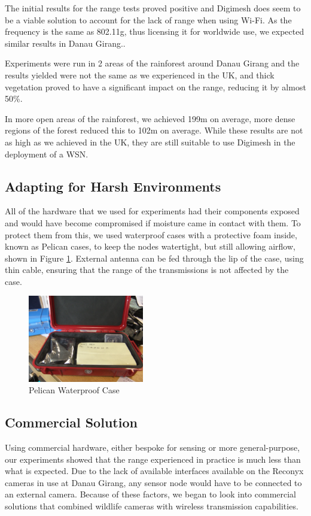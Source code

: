The initial results for the range tests proved positive and Digimesh does seem to be a viable solution to account for the lack of range when using Wi-Fi. As the frequency is the same as 802.11g, thus licensing it for worldwide use, we expected similar results in Danau Girang..
						
Experiments were run in 2 areas of the rainforest around Danau Girang and the results yielded were not the same as we experienced in the UK, and thick vegetation proved to have a significant impact on the range, reducing it by almost 50\%.
			
In more open areas of the rainforest, we achieved 199m on average, more dense regions of the forest reduced this to 102m on average. While these results are not as high as we achieved in the UK, they are still suitable to use Digimesh in the deployment of a WSN.

\subsection{Adapting for Harsh Environments}
	All of the hardware that we used for experiments had their components exposed and would have become compromised if moisture came in contact with them. To protect them from this, we used waterproof cases with a protective foam inside, known as Pelican cases, to keep the nodes watertight, but still allowing airflow, shown in Figure \ref{tech:pelican}.
	External antenna can be fed through the lip of the case, using thin cable, ensuring that the range of the transmissions is not affected by the case. 

			\begin{figure}[!t]
			\centering
			\includegraphics[width=0.45\textwidth]{Chap3/figures/pelican}
			\caption{Pelican Waterproof Case}
			\label{tech:pelican}
			\end{figure}

\subsection{Commercial Solution}
	Using commercial hardware, either bespoke for sensing or more general-purpose, our experiments showed that the range experienced in practice is much less than what is expected. Due to the lack of available interfaces available on the Reconyx cameras in use at Danau Girang, any sensor node would have to be connected to an external camera.
	Because of these factors, we began to look into commercial solutions that combined wildlife cameras with wireless transmission capabilities. 

